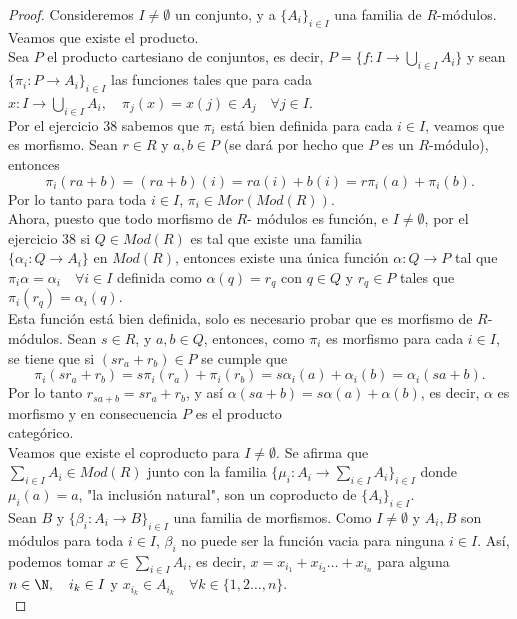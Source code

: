 \documentclass{article}
\begin{document}
\begin{enumerate}[label=\textbf{Ej \arabic*.}]
\begin{proof}
Consideremos $I\neq \emptyset$ un conjunto, y a $\{A_i\}_{i\in I}$ una familia de $R$-módulos. Veamos que existe el producto.\\
Sea $P$ el producto cartesiano de conjuntos, es decir, $P=\{f:I\to \displaystyle\bigcup_{i\in I}A_i\}$ y sean $\{\pi_i:P\to A_i\}_{i\in I}$ las funciones
tales que para cada\\ $x:I\to  \displaystyle\bigcup_{i\in I}A_i,\quad \pi_j(x)=x(j)\in A_j\quad \forall j\in I$.\\

Por el ejercicio 38 sabemos que $\pi_i$ está bien definida para cada $i\in I$, veamos que es morfismo. Sean $r\in R$ y $a,b\in P$ (se dará por hecho
que $P$ es un $R$-módulo), entonces 
\[\pi_i(ra+b)=(ra+b)(i)=ra(i)+b(i)=r\pi_i(a)+\pi_i(b).
\]
Por lo tanto para toda $i\in I$, $\pi_i\in Mor(Mod(R))$.\\

Ahora, puesto que todo morfismo de $R$- módulos es función, e $I\neq \emptyset$, por el ejercicio 38 si $Q\in Mod(R)$ es tal que existe una familia\\
$\{\alpha_i:Q\to A_i\}$ en $Mod(R)$, entonces existe una única función $\alpha:Q\to P$ tal que $\pi_i\alpha=\alpha_i\quad \forall i\in I$ definida como 
$\alpha(q)=r_q$ con $q\in Q$ y $r_q\in P$ tales que $\pi_i(r_q)=\alpha_i(q).$\\

Esta función está bien definida, solo es necesario probar que es morfismo de $R$-módulos. Sean $s\in R$, y $a,b\in Q$, entonces, como $\pi_i$ es morfismo
para cada $i\in I$, se tiene que si $(s r_a+r_b)\in P$ se cumple que
\[\pi_i(sr_a+r_b)=s\pi_i(r_a)+\pi_i(r_b)=s\alpha_i(a)+\alpha_i(b)=\alpha_i(sa+b).
\]
Por lo tanto $r_{sa+b}=sr_a+r_b$, y así $\alpha(sa+b)=s\alpha(a)+\alpha(b)$, es decir, $\alpha$ es morfismo y en consecuencia $P$ es el producto\\
 categórico. \\

Veamos que existe el coproducto para $I\neq \emptyset$. Se afirma que \\$\displaystyle\sum_{i\in I}A_i\in Mod(R)$ junto con la familia
$\{\mu_i:A_i\to \displaystyle\sum_{i\in I}A_i\}_{i\in I}$ donde $\mu_i(a)=a$, "la inclusión natural", son un coproducto de $\{A_i\}_{i\in I}$.\\

Sean $B$ y $\{\beta_i:A_i\to B\}_{i\in I}$ una familia de morfismos. Como $I\neq \emptyset$ y $A_i,B$ son módulos para toda $i\in I$, 
$\beta_i$ no puede ser la función vacia para ninguna $i\in I$. Así, podemos tomar $x\in \displaystyle\sum_{i\in I}A_i$, es decir, 
$x=x_{i_1}+x_{i_2}\ldots +x_{i_n}$ para alguna $n\in \N,\quad i_k\in I$ y $x_{i_k}\in A_{i_k}\quad \forall k\in\{1,2\ldots,n\}$.\\


\end{proof}
\end{enumerate}
\end{document}
